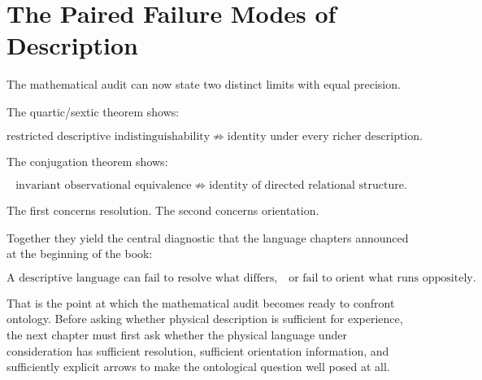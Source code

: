 \section{The Paired Failure Modes of Description}

The mathematical audit can now state two distinct limits with equal precision.

The quartic/sextic theorem shows:

\[
\boxed{
\text{restricted descriptive indistinguishability}
\not\Rightarrow
\text{identity under every richer description}.
}
\]

The conjugation theorem shows:

\[
\boxed{
\text{invariant observational equivalence}
\not\Rightarrow
\text{identity of directed relational structure}.
}
\]

The first concerns resolution. The second concerns orientation.

Together they yield the central diagnostic that the language chapters announced at the beginning of the book:

\[
\boxed{
\text{A descriptive language can fail to resolve what differs,}
\quad
\text{or fail to orient what runs oppositely.}
}
\]

That is the point at which the mathematical audit becomes ready to confront ontology. Before asking whether physical description is sufficient for experience, the next chapter must first ask whether the physical language under consideration has sufficient resolution, sufficient orientation information, and sufficiently explicit arrows to make the ontological question well posed at all.
